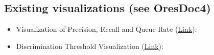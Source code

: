\documentclass[12pt,a4paper]{article}
\begin{document}
\subsection{Existing visualizations (see OresDoc4)}
\begin{itemize}
\item Visualization of Precision, Recall and Queue Rate (\href{https://blog.insightdatascience.com/visualizing-machine-learning-thresholds-to-make-better-business-decisions-4ab07f823415}{Link}):
\item Discrimination Threshold Visualization (\href{http://www.scikit-yb.org/en/latest/api/classifier/threshold.html}{Link}):
\end{itemize}
\end{document}

